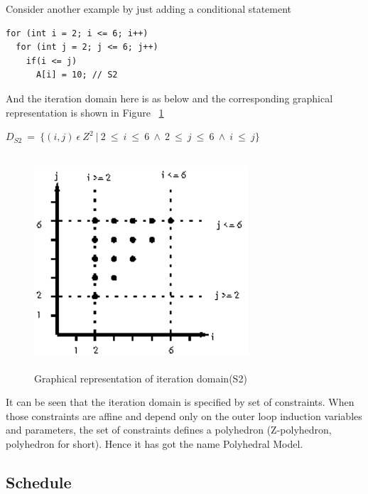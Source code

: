 \noindent
Consider another example by just adding a conditional statement
{\footnotesize
\begin{lstlisting}
for (int i = 2; i <= 6; i++)
  for (int j = 2; j <= 6; j++)
    if(i <= j)
      A[i] = 10; // S2
\end{lstlisting}
}
\noindent
And the iteration domain here is as below and the corresponding graphical representation is shown in Figure ~\ref{fig:iter1}

\begin{center}
$D_{S2}\ =\ \{(i,j)\ \epsilon\ Z^2\ |\ 2\ \leq\ i\ \leq\ 6\ \wedge\ 2\ \leq\ j\ \leq\ 6\ \wedge\ i\ \leq\ j\}$
\end{center}
\begin{figure}
\begin{center}
  \includegraphics[height=8cm,width=8cm]{images/iter1.eps}
  \caption{Graphical representation of iteration domain(S2)}
  \label{fig:iter1}
\end{center}  
\end{figure}

It can be seen that the iteration domain is specified by set of constraints. When those constraints are
affine and depend only on the outer loop induction variables and parameters, the set of constraints
defines a polyhedron (Z-polyhedron, polyhedron for short). Hence it has got the name Polyhedral Model.

\subsection{Schedule}

